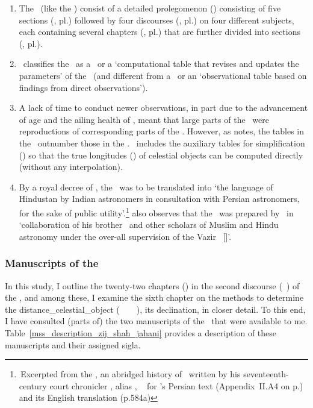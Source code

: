 \begin{enumerate}[topsep=0pt]
    \item The \ZijiShahJahani\ (like the \ZijUlughBeg) consist of a detailed prolegomenon (\muqaddima) consisting of five sections (\qism, pl.\thinspace \aqsam) followed by four discourses (\maqala, pl.\thinspace\maqalat) on four different subjects, each containing several chapters (\bab, pl.\thinspace \biban) that are further divided into sections (\fasl, pl.\thinspace\fusul).
    \item \MullaFarid\ classifies the \ZijiShahJahani\ as a \zijiHisabi\ or a `computational table that revises and updates the parameters' of the \ZijUlughBeg\ (and different from a \zijiRasadi\ or an `observational table based on findings from direct observations').
    \item A lack of time to conduct newer observations, in part due to the advancement of age and the ailing health of \MullaFarid, meant that large parts of the \ZijiShahJahani\ were reproductions of corresponding parts of the \ZijUlughBeg. However, as \textcite[585]{Ansarisurvey} notes, the tables in the \ZijiShahJahani\ outnumber those in the \ZijUlughBeg. \MullaFarid\ includes the auxiliary tables for simplification (\tashil) so that the true longitudes (\taqvim) of celestial objects can be computed directly (without any interpolation). 
    \item By a royal decree of \Shahjahan, the \ZijiShahJahani\ was to be translated into `the language of Hindustan by Indian astronomers in consultation with Persian astronomers, for the sake of public utility'.\footnote{\,Excerpted from the \MulakhkhasiShahJahanNama, an abridged history of \Shahjahan\  written by his seventeenth-century court chronicler \TahirKhan, alias \InayatKhan, \vid\ \textcite{Ansarisurvey} for \TahirKhan's Persian text (Appendix~II.\thinspace A4 on p.) and its English translation (p.\thinspace 584a)} \textcite[34]{Ghori} also observes that the \ZijiShahJahani\ was prepared by \MullaFarid\ in `collaboration of his brother \MullaTayyib\ and other scholars of Muslim and Hindu astronomy under the over-all supervision of the Vazir \AsifKhan\ [\sic]'.     
\end{enumerate}

\subsubsection{Manuscripts of the \ZijUlughBeg}\label{manuscripts_zij_shahjahani}
In this study, I outline the twenty-two chapters (\biban) in the second discourse (\maqala\idafaconsonant\ \duvum) of the \ZijiShahJahani, and among these, I examine the sixth chapter on the methods to determine the \gls{distance_celestial_object} (\bud\idafaconsonant\ \kawkab\ \az\ \muaddil\ \alnahar), \ie its declination, in closer detail. To this end, I have consulted (parts of) the two manuscripts of the \ZijiShahJahani\ that were available to me. Table~\ref{mss_description_zij_shah_jahani} provides a description of these manuscripts and their assigned sigla.

